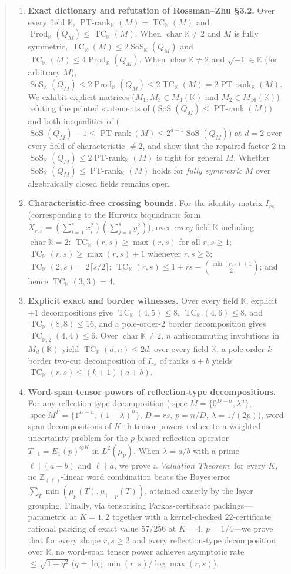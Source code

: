 \documentclass[11pt]{article}
\theoremstyle{definition}
\newcommand{\TC}{\operatorname{TC}}
\newcommand{\bTC}{\underline{\operatorname{TC}}}
\newcommand{\PT}{\operatorname{PT\text{-}rank}}
\newcommand{\SoS}{\operatorname{SoS}}
\newcommand{\Prod}{\operatorname{Prod}}
\newcommand{\K}{\mathbb{K}}
\newcommand{\R}{\mathbb{R}}
\begin{document}
\begin{abstract}
\begin{enumerate}
\item \textbf{Exact dictionary and refutation of Rossman--Zhu \S3.2.} Over every field $\K$, $\PT_\K(M) = \TC_\K(M)$ and $\Prod_\K(Q_M) \le \TC_\K(M)$. When $\operatorname{char}\K \neq 2$ and $M$ is fully symmetric, $\TC_\K(M) \le 2\SoS_\K(Q_M)$ and $\TC_\K(M) \le 4\Prod_\K(Q_M)$. When $\operatorname{char}\K \neq 2$ and $\sqrt{-1} \in \K$ (for arbitrary $M$), $\SoS_\K(Q_M) \le 2\Prod_\K(Q_M) \le 2\TC_\K(M) = 2\PT_\K(M)$. We exhibit explicit matrices ($M_1, M_3 \in M_4(\K)$ and $M_2 \in M_{16}(\K)$) refuting the printed statements of \cite[Lemma~3.13]{RZ25} ($\SoS(Q_M) \le \PT(M)$) and both inequalities of \cite[Proposition~3.16]{RZ25} ($\SoS(Q_M)-1 \le \PT(M) \le 2^{d-1}\SoS(Q_M)$) at $d=2$ over every field of characteristic $\neq 2$, and show that the repaired factor $2$ in $\SoS_\K(Q_M) \le 2\PT_\K(M)$ is tight for general $M$. Whether $\SoS_\K(Q_M) \le \PT_\K(M)$ holds for \emph{fully symmetric} $M$ over algebraically closed fields remains open.
\item \textbf{Characteristic-free crossing bounds.} For the identity matrix $I_{rs}$ (corresponding to the Hurwitz biquadratic form $X_{r,s} = (\sum_{i=1}^r x_i^2)(\sum_{j=1}^s y_j^2)$), over \emph{every} field $\K$ including $\operatorname{char}\K = 2$: $\TC_\K(r,s) \ge \max(r,s)$ for all $r,s \ge 1$; $\TC_\K(r,s) \ge \max(r,s)+1$ whenever $r,s \ge 3$; $\TC_\K(2,s) = 2\lceil s/2\rceil$; $\TC_\K(r,s) \le 1 + rs - \binom{\min(r,s)+1}{2}$; and hence $\TC_\K(3,3) = 4$.
\item \textbf{Explicit exact and border witnesses.} Over every field $\K$, explicit $\pm 1$ decompositions give $\TC_\K(4,5) \le 8$, $\TC_\K(4,6) \le 8$, and $\TC_\K(8,8) \le 16$, and a pole-order-$2$ border decomposition gives $\bTC_{\K,2}(4,4) \le 6$. Over $\operatorname{char}\K \neq 2$, $n$ anticommuting involutions in $M_d(\K)$ yield $\TC_\K(d,n) \le 2d$; over every field $\K$, a pole-order-$k$ border two-cut decomposition of $I_{rs}$ of ranks $a + b$ yields $\TC_\K(r,s) \le (k+1)(a+b)$.
\item \textbf{Word-span tensor powers of reflection-type decompositions.} For any reflection-type decomposition ($\operatorname{spec} M = \{0^{D-n},\lambda^n\}$, $\operatorname{spec} M^\Gamma = \{1^{D-n},(1-\lambda)^n\}$, $D = rs$, $p = n/D$, $\lambda = 1/(2p)$), word-span decompositions of $K$-th tensor powers reduce to a weighted uncertainty problem for the $p$-biased reflection operator $T_{-1} = E_1(p)^{\otimes K}$ in $L^2(\mu_p)$. When $\lambda = a/b$ with a prime $\ell \mid (a-b)$ and $\ell \nmid a$, we prove a \emph{Valuation Theorem}: for every $K$, no $\mathbb{Z}_{(\ell)}$-linear word combination beats the Bayes error $\sum_T \min(\mu_p(T), \mu_{1-p}(T))$, attained exactly by the layer grouping. Finally, via tensorising Farkas-certificate packings---parametric at $K = 1, 2$ together with a kernel-checked $22$-certificate rational packing of exact value $57/256$ at $K = 4$, $p = 1/4$---we prove that for every shape $r,s \ge 2$ and every reflection-type decomposition over $\R$, no word-span tensor power achieves asymptotic rate $\le \sqrt{1+q^2}$ ($q = \log\min(r,s)/\log\max(r,s)$).
\end{enumerate}


\end{abstract}
\end{document}
